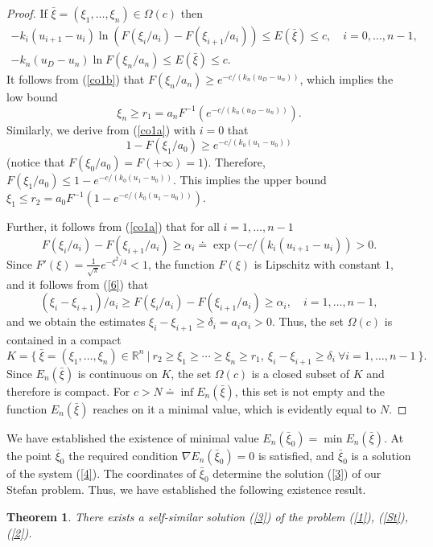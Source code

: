 \documentclass[12pt]{article}
\theoremstyle{plain}
\newtheorem{theorem}{Theorem}[section]
\theoremstyle{definition}
\numberwithin{equation}{section}
\newcommand{\R}{{\mathbb R}}
\begin{document}
\begin{proof}
If $\bar\xi=(\xi_1,\ldots,\xi_n)\in\Omega(c)$ then
\begin{align}\label{co1a}
 -k_i(u_{i+1}-u_i)\ln (F(\xi_i/a_i)-F(\xi_{i+1}/a_i))\le E(\bar\xi)\le c, \quad i=0,\ldots,n-1, \\
 \label{co1b}
-k_n(u_D-u_n)\ln F(\xi_n/a_n)\le E(\bar\xi)\le c.
 \end{align}
It follows from (\ref{co1b}) that $F(\xi_n/a_n)\ge e^{-c/(k_n(u_D-u_n))}$, which implies
the low bound
\[\xi_n\ge r_1=a_nF^{-1}(e^{-c/(k_n(u_D-u_n))}).\]
Similarly, we derive from (\ref{co1a}) with $i=0$ that
\[1-F(\xi_1/a_0)\ge e^{-c/(k_0(u_1-u_0))}\] (notice that $F(\xi_0/a_0)=F(+\infty)=1$). Therefore,
$F(\xi_1/a_0)\le 1-e^{-c/(k_0(u_1-u_0))}$. This implies the upper bound $\xi_1\le r_2=a_0F^{-1}(1-e^{-c/(k_0(u_1-u_0))})$.

Further, it follows from (\ref{co1a}) that for all $i=1,\ldots,n-1$
\begin{equation}\label{6}
F(\xi_i/a_i)-F(\xi_{i+1}/a_i)\ge \alpha_i\doteq\exp(-c/(k_i(u_{i+1}-u_i))>0.
\end{equation}
Since $F'(\xi)=\frac{1}{\sqrt{\pi}}e^{-\xi^2/4}<1$, the function $F(\xi)$ is Lipschitz with constant $1$, and it follows from (\ref{6}) that
\[
(\xi_i-\xi_{i+1})/a_i\ge F(\xi_i/a_i)-F(\xi_{i+1}/a_i)\ge \alpha_i, \quad i=1,\ldots,n-1,
\]
and we obtain the estimates $\xi_i-\xi_{i+1}\ge\delta_i=a_i\alpha_i>0$. Thus, the set $\Omega(c)$ is contained in a compact
\[
K=\{ \ \bar\xi=(\xi_1,\ldots,\xi_n)\in\R^n \ | \ r_2\ge\xi_1\ge\cdots\ge\xi_n\ge r_1, \ \xi_i-\xi_{i+1}\ge\delta_i \ \forall i=1,\ldots,n-1 \ \}.
\]
Since $E_n(\bar\xi)$ is continuous on $K$, the set $\Omega(c)$ is a closed subset of $K$ and therefore is compact. For $c>N\doteq\inf E_n(\bar\xi)$, this set is not empty and the function $E_n(\bar\xi)$ reaches on it a minimal value, which is evidently equal to $N$.
\end{proof}

We have established the existence of minimal value $E_n(\bar\xi_0)=\min E_n(\bar\xi)$. At the point $\bar\xi_0$ the required condition $\nabla E_n(\bar\xi_0)=0$ is satisfied, and $\bar\xi_0$ is a solution of the system (\ref{4}). The coordinates
of $\bar\xi_0$ determine the solution (\ref{3}) of our Stefan problem. Thus, we have established the following existence result.

\begin{theorem}\label{th1a}
There exists a self-similar solution (\ref{3}) of the problem (\ref{1}), (\ref{St}), (\ref{2}).
\end{theorem}
\end{document}
